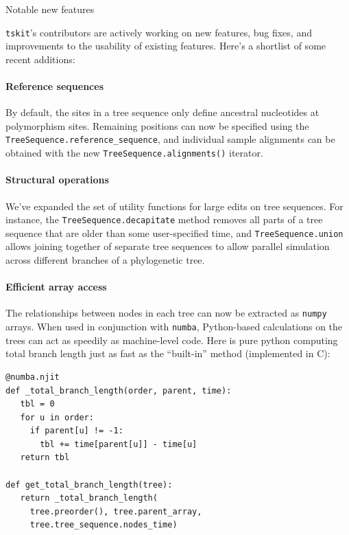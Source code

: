 \documentclass[landscape,a0paper,fontscale=0.4]{baposter}
\newcommand{\tskit}{{\texttt{tskit}}}
\begin{document}
\begin{poster}
\begin{posterbox}[name=operations,column=3,above=bottom,span=1]{Notable new features}

\tskit{}'s contributors are actively working on
    new features, bug fixes, and improvements to the usability of existing
    features. Here's a shortlist of some recent additions:

\paragraph{Reference sequences}
By default, the sites in a tree sequence only define ancestral nucleotides at
    polymorphism sites. Remaining positions can now be specified using the
    \texttt{TreeSequence.reference\_sequence}, and individual sample alignments can
    be obtained with the new \texttt{TreeSequence.alignments()} iterator.

\paragraph{Structural operations}
We've expanded the set of utility functions for large edits on tree sequences.
    For instance, the \texttt{TreeSequence.decapitate} method removes all parts of a
    tree sequence that are older than some user-specified time,
    and \texttt{TreeSequence.union} allows joining together of separate tree sequences
    to allow parallel simulation across different branches of a phylogenetic tree.

\paragraph{Efficient array access}
The relationships between nodes in each tree can now be extracted as \texttt{numpy}
    arrays. When used in conjunction with \texttt{numba},
    Python-based calculations on the trees can act as speedily as
    machine-level code. Here is pure python computing total branch length
    just as fast as the ``built-in'' method (implemented in C):

\begin{multicols}{2}
\begin{verbatim}
@numba.njit
def _total_branch_length(order, parent, time):
   tbl = 0
   for u in order:
     if parent[u] != -1:
       tbl += time[parent[u]] - time[u]
   return tbl

def get_total_branch_length(tree):
   return _total_branch_length(
     tree.preorder(), tree.parent_array,
     tree.tree_sequence.nodes_time)
\end{verbatim}


\end{multicols}
\end{posterbox}
\end{poster}
\end{document}

